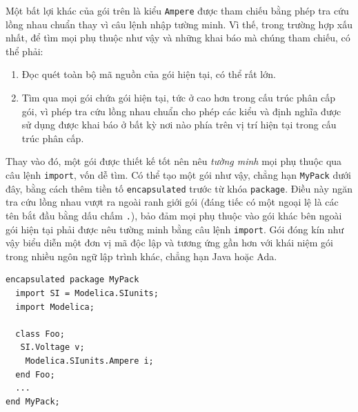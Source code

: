 Một bất lợi khác của gói trên là kiểu \texttt{Ampere} được tham chiếu bằng phép tra cứu lồng nhau chuẩn thay vì câu lệnh nhập tường minh. Vì thế, trong trường hợp xấu nhất, để tìm mọi phụ thuộc như vậy và những khai báo mà chúng tham chiếu, có thể phải:
\begin{enumerate}
\item Đọc quét toàn bộ mã nguồn của gói hiện tại, có thể rất lớn.
\item Tìm qua mọi gói chứa gói hiện tại, tức ở cao hơn trong cấu trúc phân cấp gói, vì phép tra cứu lồng nhau chuẩn cho phép các kiểu và định nghĩa được sử dụng được khai báo ở bất kỳ nơi nào phía trên vị trí hiện tại trong cấu trúc phân cấp.
\end{enumerate}
Thay vào đó, một gói được thiết kế tốt nên nêu \emph{tường minh} mọi phụ thuộc qua câu lệnh \texttt{import}, vốn dễ tìm. Có thể tạo một gói như vậy, chẳng hạn \texttt{MyPack} dưới đây, bằng cách thêm tiền tố \texttt{encapsulated} trước từ khóa \texttt{package}. Điều này ngăn tra cứu lồng nhau vượt ra ngoài ranh giới gói (đáng tiếc có một ngoại lệ là các tên bắt đầu bằng dấu chấm \texttt{.}), bảo đảm mọi phụ thuộc vào gói khác bên ngoài gói hiện tại phải được nêu tường minh bằng câu lệnh \texttt{import}. Gói đóng kín như vậy biểu diễn một đơn vị mã độc lập và tương ứng gần hơn với khái niệm gói trong nhiều ngôn ngữ lập trình khác, chẳng hạn Java hoặc Ada.
\begin{verbatim}
encapsulated package MyPack
  import SI = Modelica.SIunits;
  import Modelica;

  class Foo;
   SI.Voltage v;
    Modelica.SIunits.Ampere i;
  end Foo;
  ...
end MyPack;
\end{verbatim}

